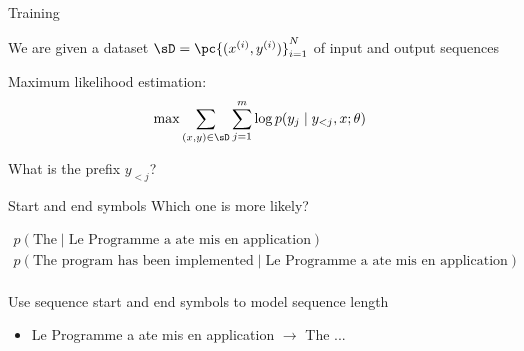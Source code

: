 \documentclass[usenames,dvipsnames,notes,11pt,aspectratio=169,hyperref={colorlinks=true, linkcolor=blue}]{beamer}
\begin{document}
\begin{frame}
    {Training}

    We are given a dataset $\sD = \pc{(x^{(i)},y^{(i)})}_{i=1}^N$ of input and output sequences

    Maximum likelihood estimation:\\
    $$
    \max \sum_{(x,y)\in\sD} \sum_{j=1}^m \log p(y_j\mid y_{<j}, x; \theta)
    $$
    \pause

    What is the prefix $y_{<j}$?\\[1ex]\pause
\end{frame}

\begin{frame}
    {Start and end symbols}
    Which one is more likely?

    \begin{align*}
    p(\text{The} \mid \text{Le Programme    a    ate    mis    en application}) \\
    p(\text{The program has been implemented} \mid \text{Le Programme    a    ate    mis    en application}) \\
    \end{align*}

    \pause
    Use sequence start and end symbols to model sequence length
    \begin{itemize}
        \item {Le Programme    a    ate    mis    en application}
            $\to$  The ... 
    \end{itemize}
\end{frame}
\end{document}
